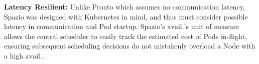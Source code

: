 \textbf{Latency Resilient:} Unlike Pronto which assumes no communication
latency, Spazio was designed with Kubernetes in mind, and thus must consider
possible latency in communication and Pod startup. Spazio's $\text{avail.}$'s
unit of measure allows the central scheduler to easily track the estimated cost
of Pods in-flight, ensuring subsequent scheduling decisions do not mistakenly
overload a Node with a high $\text{avail.}$.
%
%
%
%
